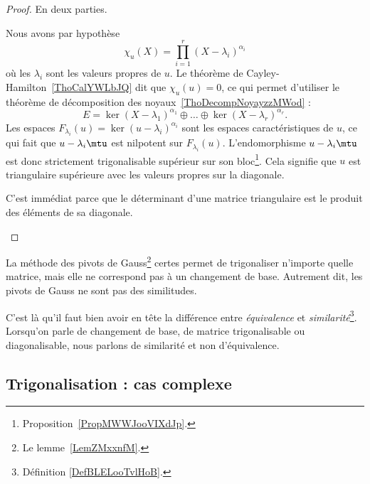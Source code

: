 \begin{proof}
	En deux parties.
	\begin{subproof}
		\spitem[\ref{ItemZKDMooOrTHkwii}\( \Rightarrow\)\ref{ItemZKDMooOrTHkwi}]
		Nous avons par hypothèse
		\begin{equation}
			\chi_u(X)=\prod_{i=1}^r(X-\lambda_i)^{\alpha_i}
		\end{equation}
		où les \( \lambda_i\) sont les valeurs propres de \( u\). Le théorème de Cayley-Hamilton~\ref{ThoCalYWLbJQ} dit que \( \chi_u(u)=0\), ce qui permet d'utiliser le théorème de décomposition des noyaux~\ref{ThoDecompNoyayzzMWod} :
		\begin{equation}
			E=\ker(X-\lambda_1)^{\alpha_1}\oplus\ldots\oplus\ker(X-\lambda_r)^{\alpha_r}.
		\end{equation}
		Les espaces \( F_{\lambda_i}(u)=\ker(u-\lambda_i)^{\alpha_i}\) sont les espaces caractéristiques de \( u\), ce qui fait que \( u-\lambda_i\mtu\) est nilpotent sur \( F_{\lambda_i}(u)\). L'endomorphisme \( u-\lambda_i\mtu\) est donc strictement trigonalisable supérieur sur son bloc\footnote{Proposition~\ref{PropMWWJooVIXdJp}.}. Cela signifie que \( u\) est triangulaire supérieure avec les valeurs propres sur la diagonale.

		\spitem[\ref{ItemZKDMooOrTHkwi}\( \Rightarrow\)\ref{ItemZKDMooOrTHkwii}]

		C'est immédiat parce que le déterminant d'une matrice triangulaire est le produit des éléments de sa diagonale.
	\end{subproof}
\end{proof}

\begin{remark}
	La méthode des pivots de Gauss\footnote{Le lemme~\ref{LemZMxxnfM}.} certes permet de trigonaliser n'importe quelle matrice, mais elle ne correspond pas à un changement de base. Autrement dit, les pivots de Gauss ne sont pas des similitudes.

	C'est là qu'il faut bien avoir en tête la différence entre \emph{équivalence} et \emph{similarité}\footnote{Définition \ref{DefBLELooTvlHoB}.}. Lorsqu'on parle de changement de base, de matrice trigonalisable ou diagonalisable, nous parlons de similarité et non d'équivalence.
\end{remark}

\subsection{Trigonalisation : cas complexe}

